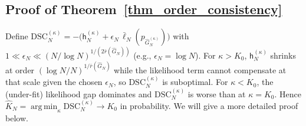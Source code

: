 \documentclass[twoside]{article}
\newcommand{\height}{\mathsf{h}}
\theoremstyle{plain}
\theoremstyle{definition}
\theoremstyle{plain}
\DeclareMathOperator*{\argmin}{arg\,min}
\begin{document}
\subsection{Proof of Theorem~\ref{thm_order_consistency}}

Define \(\mathrm{DSC}_N^{(\kappa)}=-\big(\height_N^{(\kappa)}+\epsilon_N\,\bar\ell_N(p_{\widehat G_N^{(\kappa)}})\big)\) with \(1\ll \epsilon_N \ll (N/\log N)^{1/(2\bar r(\widehat G_N))}\) (e.g., \(\epsilon_N=\log N\)).
For \(\kappa>K_0\), \(\height_N^{(\kappa)}\) shrinks at order \((\log N/N)^{1/\bar r(\widehat G_N)}\) while the likelihood term cannot compensate at that scale given the chosen \(\epsilon_N\), so \(\mathrm{DSC}_N^{(\kappa)}\) is suboptimal.
For \(\kappa<K_0\), the (under-fit) likelihood gap dominates and \(\mathrm{DSC}_N^{(\kappa)}\) is worse than at \(\kappa=K_0\).
Hence \(\widehat K_N=\argmin_\kappa \mathrm{DSC}_N^{(\kappa)}\to K_0\) in probability. We will give a more detailed proof below.
\end{document}
